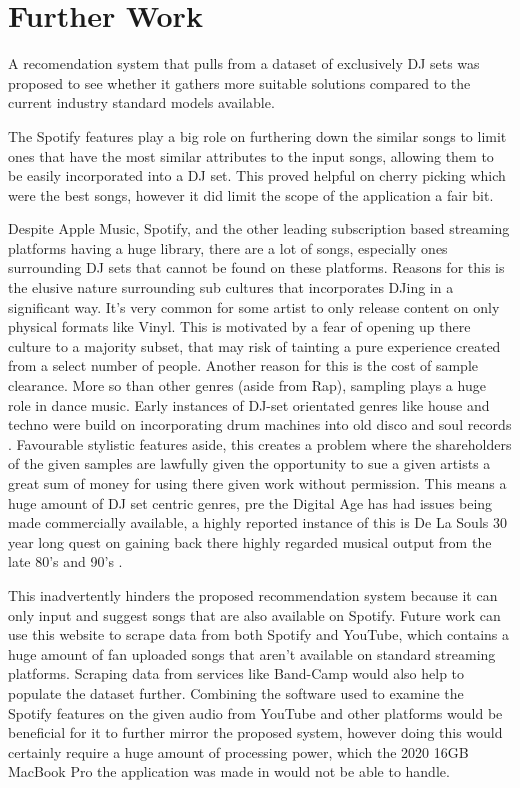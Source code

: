 
\graphicspath{{Chapter7/}}

\chapter{Further Work}

A recomendation system that pulls from a dataset of exclusively DJ sets was proposed to see whether it gathers more suitable solutions compared to the current industry standard models available. 

The Spotify features play a big role on furthering down the similar songs to limit ones that have the most similar attributes to the input songs, allowing them to be easily incorporated into a DJ set. This proved helpful on cherry picking which were the best songs, however it did limit the scope of the application a fair bit. 

Despite Apple Music, Spotify, and the other leading subscription based streaming platforms having a huge library, there are a lot of songs, especially ones surrounding DJ sets that cannot be found on these platforms. Reasons for this is the elusive nature surrounding sub cultures that incorporates DJing in a significant way. It's very common for some artist to only release content on only physical formats like Vinyl. This is motivated by a fear of opening up there culture to a majority subset, that may risk of tainting a pure experience created from a select number of people. Another reason for this is the cost of sample clearance. More so than other genres (aside from Rap), sampling plays a huge role in dance music. Early instances of DJ-set orientated genres like house and techno were build on incorporating drum machines into old disco and soul records \citep{reynolds_energy_2013}. Favourable stylistic features aside, this creates a problem where the shareholders of the given samples are lawfully given the opportunity to sue a given artists a great sum of money for using there given work without permission. This means a huge amount of DJ set centric genres, pre the Digital Age has had issues being made commercially available, a highly reported instance of this is De La Souls 30 year long quest on gaining back there highly regarded musical output from the late 80's and 90's \citep{saunders_soul_2023}.

This inadvertently hinders the proposed recommendation system because it can only input and suggest songs that are also available on Spotify. Future work can use this website to scrape data from both Spotify and YouTube, which contains a huge amount of fan uploaded songs that aren't available on standard streaming platforms. Scraping data from services like Band-Camp would also help to populate the dataset further. Combining the software used to examine the Spotify features on the given audio from YouTube and other platforms would be beneficial for it to further mirror the proposed system, however doing this would certainly require a huge amount of processing power, which the 2020 16GB MacBook Pro the application was made in would not be able to handle.

